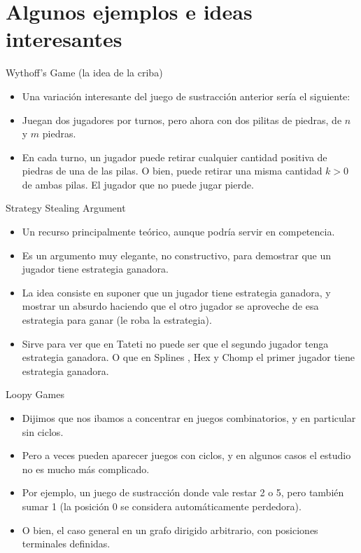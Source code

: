 \documentclass{beamer}
\begin{document}
\section{Algunos ejemplos e ideas interesantes}

\begin{frame}{Wythoff's Game (la idea de la criba)}
    \begin{itemize}
        \item Una variación interesante del juego de sustracción anterior sería el siguiente:
        \item Juegan dos jugadores por turnos, pero ahora con dos pilitas de piedras, de $n$ y $m$ piedras.
        \item En cada turno, un jugador puede retirar cualquier cantidad positiva de piedras de una de las pilas. O bien, puede
        retirar una misma cantidad $k > 0$ de ambas pilas. El jugador que no puede jugar pierde.
    \end{itemize}
\end{frame}

\begin{frame}{Strategy Stealing Argument}
    \begin{itemize}
        \item Un recurso principalmente teórico, aunque podría servir en competencia.
        \item Es un argumento muy elegante, no constructivo, para demostrar que un jugador tiene estrategia ganadora.
        \item La idea consiste en suponer que un jugador tiene estrategia ganadora, y mostrar un absurdo haciendo que el otro jugador
        se aproveche de esa estrategia para ganar (le roba la estrategia).
        \item Sirve para ver que en Tateti no puede ser que el segundo jugador tenga estrategia ganadora. O que en Splines , Hex y Chomp
        el primer jugador tiene estrategia ganadora.
    \end{itemize}
\end{frame}

\begin{frame}{Loopy Games}
    \begin{itemize}
        \item Dijimos que nos ibamos a concentrar en juegos combinatorios, y en particular sin ciclos.
        \item Pero a veces pueden aparecer juegos con ciclos, y en algunos casos el estudio no es mucho más complicado.
        \item Por ejemplo, un juego de sustracción donde vale restar 2 o 5, pero también sumar 1 (la posición 0 se considera automáticamente perdedora).
        
        \item O bien, el caso general en un grafo dirigido arbitrario, con posiciones terminales definidas.
    \end{itemize}
\end{frame}
\end{document}
